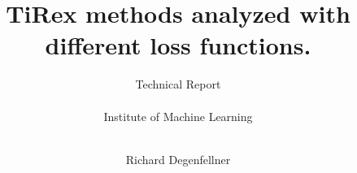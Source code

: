 \documentclass[a4paper,oneside,10pt,ngerman,english]{scrartcl}
\begin{document}

\title{TiRex methods analyzed with different loss functions.}


\subtitle{Technical Report\\%
    \hfill\\%
    Institute of Machine Learning\\
    \hfill\\%
}

\author{%
    Richard Degenfellner 
    \authornewline
    \authornewline
}






\end{document}
